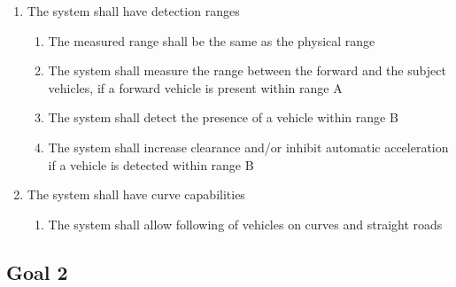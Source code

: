 \begin{enumerate}
\begin{enumerate}[label*=\arabic*]
\begin{enumerate}[label*=\arabic*]
        \end{enumerate}
        \item{The system shall have detection ranges}
        \begin{enumerate}[label*=\arabic*]
            \item{The measured range shall be the same as the physical range}
            \item{The system shall measure the range between the forward and the subject vehicles, if a forward vehicle is present within range A}
            \item{The system shall detect the presence of a vehicle within range B}
            \item{The system shall increase clearance and/or inhibit automatic acceleration if a vehicle is detected within range B}
        \end{enumerate}
        \item{The system shall have curve capabilities}
        \begin{enumerate}[label*=\arabic*]
            \item The system shall allow following of vehicles on curves and straight roads
        \end{enumerate}
    \end{enumerate}
\end{enumerate}


\vspace{1.5cm}

\subsection{Goal 2}

